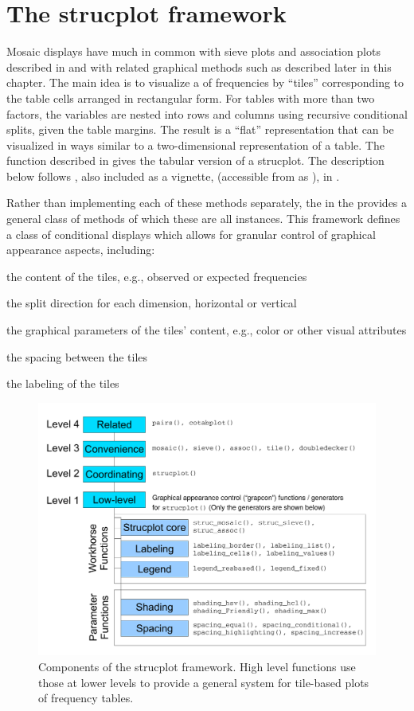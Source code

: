 \documentclass[10pt,krantz2]{krantz}\usepackage[]{graphicx}\usepackage[]{color}
\begin{document}
\section{The strucplot framework}\label{sec:mosaic-strucplot}
Mosaic displays have much in common with sieve plots and association plots
described in  and with related graphical methods
such as  described later in this chapter.
The main idea is to visualize a \ctab of frequencies by ``tiles'' corresponding
to the table cells arranged in rectangular form.
For \mway tables with more than two factors,
the variables are nested into rows and columns using recursive
conditional splits, given the table margins. The result is a
``flat'' representation that can be visualized in
ways similar to a two-dimensional representation of a table.
The  function described in  gives the tabular
version of a strucplot.  The description below follows \citet{MeyerZeileisHornik:2006}, also
included as a vignette,
(accessible from \R as ), in .

Rather than implementing each of these methods separately, the
 in the  provides a
general class of methods of which these are all instances.
This framework defines a class of conditional displays which allows
for granular control of graphical appearance aspects, including:

\begin{itemize*}
\item the content of the tiles, e.g., observed or expected frequencies
\item the split direction for each dimension, horizontal or vertical
\item the graphical parameters of the tiles' content, e.g., color or other visual attributes
\item the spacing between the tiles
\item the labeling of the tiles
\end{itemize*}

\begin{figure}
\includegraphics[width=.8\textwidth]{ch05/fig/struc}
\caption{Components of the strucplot framework. High level functions use those at lower levels to provide a general system for tile-based plots of frequency tables.}
\label{fig:struc}
\end{figure}
\end{document}
